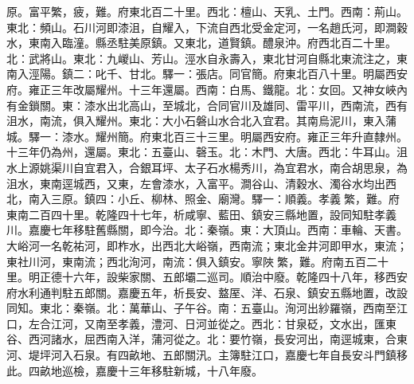 \begin{pinyinscope}
原。富平繁，疲，難。府東北百二十里。西北：檀山、天乳、土門。西南：荊山。東北：頻山。石川河即漆沮，自耀入，下流自西北受金定河，一名趙氏河，即澗穀水，東南入臨潼。縣丞駐美原鎮。又東北，道賢鎮。醴泉沖。府西北百二十里。北：武將山。東北：九嵕山、芳山。涇水自永壽入，東北甘河自縣北東流注之，東南入涇陽。鎮二：叱千、甘北。驛一：張店。同官簡。府東北百八十里。明屬西安府。雍正三年改屬耀州。十三年還屬。西南：白馬、鐵龍。北：女回。又神女峽內有金鎖關。東：漆水出北高山，至城北，合同官川及雄同、雷平川，西南流，西有沮水，南流，俱入耀州。東北：大小石磐山水合北入宜君。其南烏泥川，東入蒲城。驛一：漆水。耀州簡。府東北百三十三里。明屬西安府。雍正三年升直隸州。十三年仍為州，還屬。東北：五臺山、磬玉。北：木門、大唐。西北：牛耳山。沮水上源姚渠川自宜君入，合銀耳坪、太子石水楊秀川，為宜君水，南合胡思泉，為沮水，東南逕城西，又東，左會漆水，入富平。澗谷山、清穀水、濁谷水均出西北，南入三原。鎮四：小丘、柳林、照金、廟灣。驛一：順義。孝義繁，難。府東南二百四十里。乾隆四十七年，析咸寧、藍田、鎮安三縣地置，設同知駐孝義川。嘉慶七年移駐舊縣關，即今治。北：秦嶺。東：大頂山。西南：車輪、天書。大峪河一名乾祐河，即柞水，出西北大峪嶺，西南流；東北金井河即甲水，東流；東社川河，東南流；西北洵河，南流：俱入鎮安。寧陜繁，難。府南五百二十里。明正德十六年，設柴家關、五郎壩二巡司。順治中廢。乾隆四十八年，移西安府水利通判駐五郎關。嘉慶五年，析長安、盩厔、洋、石泉、鎮安五縣地置，改設同知。東北：秦嶺。北：萬華山、子午谷。南：五臺山。洵河出紗羅嶺，西南至江口，左合江河，又南至孝義，澧河、日河並從之。西北：甘泉砭，文水出，匯東谷、西河諸水，屈西南入洋，蒲河從之。北：要竹嶺，長安河出，南逕城東，合東河、堤坪河入石泉。有四畝地、五郎關汛。主簿駐江口，嘉慶七年自長安斗門鎮移此。四畝地巡檢，嘉慶十三年移駐新城，十八年廢。


\end{pinyinscope}
